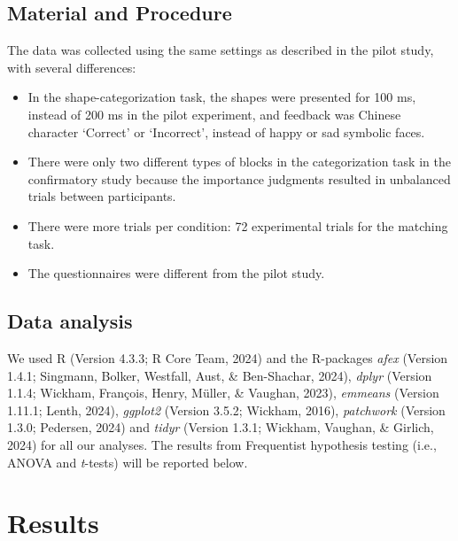 \documentclass[
  man]{apa6}
\providecommand{\tightlist}{%
  \setlength{\itemsep}{0pt}\setlength{\parskip}{0pt}}
\begin{document}
\subsection{Material and Procedure}\label{material-and-procedure}

The data was collected using the same settings as described in the pilot study, with several differences:

\begin{itemize}
\tightlist
\item
  In the shape-categorization task, the shapes were presented for 100 ms, instead of 200 ms in the pilot experiment, and feedback was Chinese character `Correct' or `Incorrect', instead of happy or sad symbolic faces.
\item
  There were only two different types of blocks in the categorization task in the confirmatory study because the importance judgments resulted in unbalanced trials between participants.
\item
  There were more trials per condition: 72 experimental trials for the matching task.
\item
  The questionnaires were different from the pilot study.
\end{itemize}

\subsection{Data analysis}\label{data-analysis}

We used R (Version 4.3.3; R Core Team, 2024) and the R-packages \emph{afex} (Version 1.4.1; Singmann, Bolker, Westfall, Aust, \& Ben-Shachar, 2024), \emph{dplyr} (Version 1.1.4; Wickham, François, Henry, Müller, \& Vaughan, 2023), \emph{emmeans} (Version 1.11.1; Lenth, 2024), \emph{ggplot2} (Version 3.5.2; Wickham, 2016), \emph{patchwork} (Version 1.3.0; Pedersen, 2024) and \emph{tidyr} (Version 1.3.1; Wickham, Vaughan, \& Girlich, 2024) for all our analyses. The results from Frequentist hypothesis testing (i.e., ANOVA and \emph{t}-tests) will be reported below.

\section{Results}\label{results}
\end{document}
